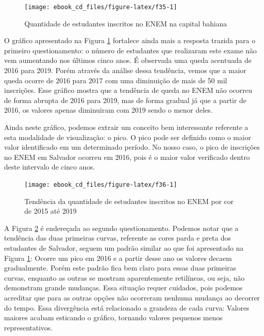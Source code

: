 \documentclass[
  portuguese,
  oneside]{book}
\begin{document}
\begin{figure}

{\centering \texttt{[image: ebook\_cd\_files/figure-latex/f35-1]} 

}

\caption{Quantidade de estudantes inscritos no ENEM na capital bahiana}\label{fig:f35}
\end{figure}

O gráfico apresentado na Figura \ref{fig:f35} fortalece ainda mais a resposta trazida para o primeiro questionamento: o número de estudantes que realizaram este exame não vem aumentando nos últimos cinco anos. É observada uma queda acentuada de 2016 para 2019. Porém através da análise dessa tendência, vemos que a maior queda ocorre de 2016 para 2017 com uma diminuição de mais de 50 mil inscrições. Esse gráfico mostra que a tendência de queda no ENEM não ocorreu de forma abrupta de 2016 para 2019, mas de forma gradual já que a partir de 2016, os valores apenas diminuiram com 2019 sendo o menor deles.

Ainda neste gráfico, podemos extrair um conceito bem interessante referente a esta modalidade de visualização: o pico. O pico pode ser definido como o maior valor identificado em um determinado período. No nosso caso, o pico de inscrições no ENEM em Salvador ocorreu em 2016, pois é o maior valor verificado dentro deste intervalo de cinco anos.

\begin{figure}

{\centering \texttt{[image: ebook\_cd\_files/figure-latex/f36-1]} 

}

\caption{Tendência da quantidade de estudantes inscritos no ENEM por cor de 2015 até 2019}\label{fig:f36}
\end{figure}

A Figura \ref{fig:f36} é endereçada ao segundo questionamento. Podemos notar que a tendência das duas primeiras curvas, referente as cores parda e preta dos estudantes de Salvador, seguem um padrão similar ao que foi apresentado na Figura \ref{fig:f35}: Ocorre um pico em 2016 e a partir desse ano os valores decaem gradualmente. Porém este padrão fica bem claro para essas duas primeiras curvas, enquanto as outras se mostram aparentemente retilíneas, ou seja, não demonstram grande mudanças. Essa situação requer cuidados, pois podemos acreditar que para as outras opções não ocorreram nenhuma mudança ao decorrer do tempo. Essa divergência está relacionado a grandeza de cada curva: Valores maiores acabam esticando o gráfico, tornando valores pequenos menos representativos.
\end{document}
